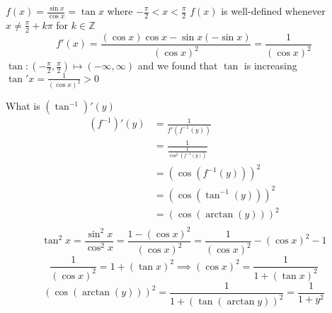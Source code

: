 \begin{example*}
  $f(x) = \frac{\sin x}{\cos x} = \tan x$ where $-\frac{\pi}{2} < x < \frac{\pi}{2}$
  $f(x)$ is well-defined whenever $x\neq \frac{\pi}{2} + k\pi$ for $k \in \mathbb{Z}$
  $$f'(x) = \frac{(\cos x)\cos x - \sin x (-\sin x)}{(\cos x)^2} = \frac{1}{(\cos x)^2}$$
  $\tan : \left(-\frac{\pi}{2}, \frac{\pi}{2}\right) \mapsto (-\infty, \infty)$ and we found that $\tan$ is increasing $\tan' x = \frac{1}{(\cos x)^ 2} > 0$

  What is $(\tan^{-1})'(y)$
  \begin{align*}
    (f^{-1})'(y) &= \frac{1}{f'(f^{-1}(y))} \\
    &= \frac{1}{\frac{1}{\cos^2(f^{-1}(y))}} \\
    &= (\cos(f^{-1}(y)))^2 \\
    &= (\cos(\tan^{-1}(y)))^2 \\
    &= (\cos(\arctan(y)))^2 \\
  \end{align*}
  $$\tan^2 x = \frac{\sin^2 x}{\cos^2 x} = \frac{1-(\cos x)^2}{(\cos x)^2} = \frac{1}{(\cos x)^2}-(\cos x)^2-1$$
  $$\frac{1}{(\cos x)^2} = 1 + (\tan x)^2 \implies (\cos x)^2 = \frac{1}{1 + (\tan x)^2}$$
  $$(\cos(\arctan(y)))^2 = \frac{1}{1 + (\tan(\arctan y))^2} = \frac{1}{1+y^2}$$
\end{example*}
